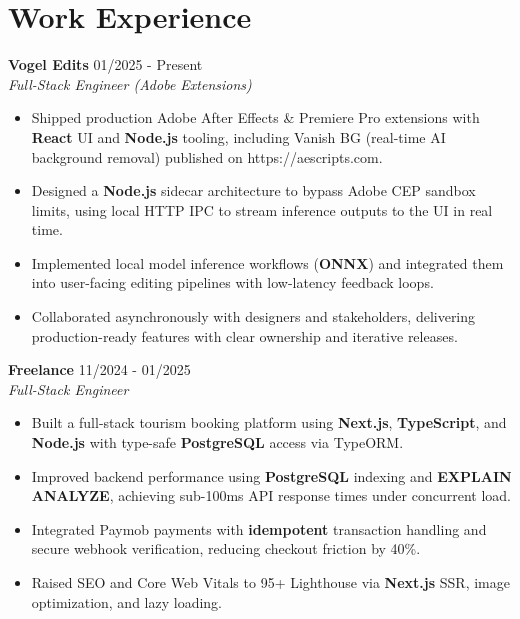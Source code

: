 \documentclass[10pt, a4paper]{article}
\begin{document}
\section{Work Experience}
\textbf{Vogel Edits} \hfill {\small\textcolor{subtle}{01/2025 - Present}} \\
{\textit{\textcolor{subtle}{Full-Stack Engineer (Adobe Extensions)}}}\\\begin{itemize}
\item Shipped production Adobe After Effects \& Premiere Pro extensions with \textbf{React} UI and \textbf{Node.js} tooling, including Vanish BG (real-time AI background removal) published on https://aescripts.com.
\item Designed a \textbf{Node.js} sidecar architecture to bypass Adobe CEP sandbox limits, using local HTTP IPC to stream inference outputs to the UI in real time.
\item Implemented local model inference workflows (\textbf{ONNX}) and integrated them into user-facing editing pipelines with low-latency feedback loops.
\item Collaborated asynchronously with designers and stakeholders, delivering production-ready features with clear ownership and iterative releases.
\end{itemize}

\textbf{Freelance} \hfill {\small\textcolor{subtle}{11/2024 - 01/2025}} \\
{\textit{\textcolor{subtle}{Full-Stack Engineer}}}\\\begin{itemize}
\item Built a full-stack tourism booking platform using \textbf{Next.js}, \textbf{TypeScript}, and \textbf{Node.js} with type-safe \textbf{PostgreSQL} access via TypeORM.
\item Improved backend performance using \textbf{PostgreSQL} indexing and \textbf{EXPLAIN ANALYZE}, achieving sub-100ms API response times under concurrent load.
\item Integrated Paymob payments with \textbf{idempotent} transaction handling and secure webhook verification, reducing checkout friction by 40\%.
\item Raised SEO and Core Web Vitals to 95+ Lighthouse via \textbf{Next.js} SSR, image optimization, and lazy loading.
\end{itemize}

\end{document}
